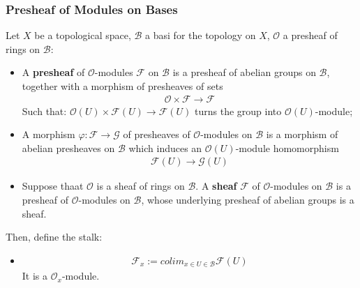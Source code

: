 \documentclass[Total.tex]{subfiles}
\begin{document}
				\subsubsection{Presheaf of Modules on Bases}
					\begin{Def}
						Let $X$ be a topological space, $\mathcal{B}$ a basi for the topology on $X$, $\mathcal{O}$ a presheaf of rings on $\mathcal{B}$:
						\begin{itemize}
							\item A \textbf{presheaf} of $\mathcal{O}$-modules $\mathcal{F}$ on $\mathcal{B}$ is a presheaf of abelian groups on $\mathcal{B}$, together with a morphism of presheaves of sets
							\begin{gather*}
								\mathcal{O}\times \mathcal{F}\rightarrow \mathcal{F}
							\end{gather*}
							Such that: $\mathcal{O}(U)\times \mathcal{F}(U)\rightarrow \mathcal{F}(U)$ turns the group into $\mathcal{O}(U)$-module;
							\item A morphism $\varphi:\mathcal{F}\rightarrow \mathcal{G}$ of presheaves of $\mathcal{O}$-modules on $\mathcal{B}$ is a morphism of abelian presheaves on $\mathcal{B}$ which induces an $\mathcal{O}(U)$-module homomorphism
							\begin{gather*}
								\mathcal{F}(U)\rightarrow \mathcal{G}(U)
							\end{gather*}
							\item Suppose thaat $\mathcal{O}$ is a sheaf of rings on $\mathcal{B}$. A \textbf{sheaf} $\mathcal{F}$ of $\mathcal{O}$-modules on $\mathcal{B}$ is a presheaf of $\mathcal{O}$-modules on $\mathcal{B}$, whose underlying presheaf of abelian groups is a sheaf.
						\end{itemize}
						Then, define the stalk:
						\begin{itemize}
							\item \begin{gather*}
								\mathcal{F}_x:=colim_{x\in U\in \mathcal{B}} \mathcal{F}(U)
							\end{gather*}
							It is a $\mathcal{O}_x$-module.
						\end{itemize}
					\end{Def}
					
\end{document}
